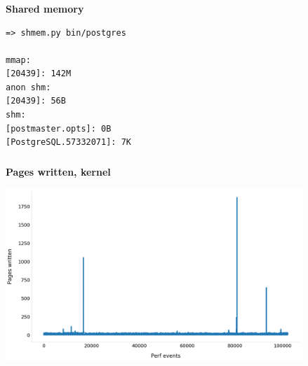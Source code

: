 \documentclass[usenames,dvipsnames, 18pt, compress, aspectratio=169]{beamer}
\begin{document}
\begin{frame}[fragile]{}
    \frametitle{}
    \begin{center}
        \textbf{Shared memory}

        \begin{flushleft}
		\begin{verbatim}
=> shmem.py bin/postgres

mmap:
[20439]: 142M
anon shm:
[20439]: 56B
shm:
[postmaster.opts]: 0B
[PostgreSQL.57332071]: 7K
        \end{verbatim}
        \end{flushleft}

    \end{center}
\end{frame}

\begin{frame}
    \frametitle{}
    \begin{center}
    \textbf{Pages written, kernel}

        \includegraphics[width=0.84\textwidth,center]{writeback.png}

    \end{center}
\end{frame}
\end{document}
